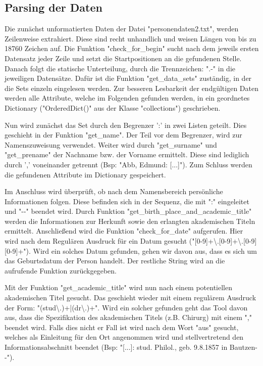 \subsection{Parsing der Daten}
 \label{subsec:Parsing der Daten}


Die zunächst unformatierten Daten der Datei "{}personendaten2.txt"{}, werden Zeilenweise extrahiert. Diese sind recht unhandlich und weisen Längen von bis zu 18760 Zeichen auf. Die Funktion "{}check\_for\_begin"{} sucht nach dem jeweils ersten Datensatz jeder Zeile und setzt die Startpositionen an die gefundenen Stelle. Danach folgt die statische Unterteilung, durch die Trennzeichen: "{}.-"{} in die jeweiligen Datensätze. Dafür ist die Funktion "{}get\_data\_sets"{} zuständig, in der die Sets einzeln eingelesen werden. Zur besseren Lesbarkeit der endgültigen Daten werden alle Attribute, welche im Folgenden gefunden werden, in ein geordnetes Dictionary ("{}OrderedDict()"{} aus der Klasse "{}collections"{}) geschrieben.

Nun wird zunächst das Set durch den Begrenzer '{}:'{} in zwei Listen geteilt. Dies geschieht in der Funktion "{}get\_name"{}. Der Teil vor dem Begrenzer, wird zur Namenszuweisung verwendet. Weiter wird durch "{}get\_surname"{} und "{}get\_prename"{} der Nachname bzw. der Vorname ermittelt. Diese sind lediglich durch '{},'{} voneinander getrennt (Bsp: "{}Abb, Edmund: [...]"{}). Zum Schluss werden die gefundenen Attribute im Dictionary gespeichert.

Im Anschluss wird überprüft, ob nach dem Namensbereich persönliche Informationen folgen. Diese befinden sich in der Sequenz, die mit "{}:"{} eingeleitet und "{}-{}-"{} beendet wird. Durch Funktion "{}get\_birth\_place\_and\_academic\_title"{} werden die Informationen zur Herkunft sowie den erlangten akademischen Titeln ermittelt. Anschließend wird die Funktion "{}check\_for\_date"{} aufgerufen. Hier wird nach dem Regulären Ausdruck für ein Datum gesucht ("{}[0-9]+\textbackslash.[0-9]+\textbackslash.[0-9][0-9]+"{}). Wird ein solches Datum gefunden, gehen wir davon aus, dass es sich um das Geburtsdatum der Person handelt. Der restliche String wird an die aufrufende Funktion zurückgegeben.

Mit der Funktion "{}get\_academic\_title"{} wird nun nach einem potentiellen akademischen Titel gesucht. Das geschieht wieder mit einem regulärem Ausdruck der Form: "{}(stud\textbackslash.)+|(dr\textbackslash.)+"{}. Wird ein solcher gefunden geht das Tool davon aus, dass die Spezifikation des akademischen Titels (z.B. Chirurg) mit einem "{},"{} beendet wird. Falls dies nicht er Fall ist wird nach dem Wort "{}aus"{} gesucht, welches als Einleitung für den Ort angenommen wird und stellvertretend den Informationsabschnitt beendet (Bsp: "{}[...]: stud. Philol., geb. 9.8.1857 in Bautzen-{}-"{}).

